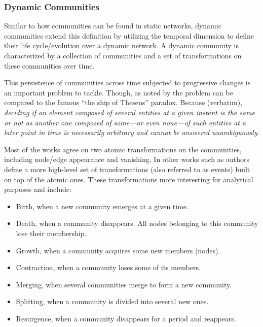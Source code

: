\documentclass[
acmsmall,
nonacm,
screen,
acmthm]{acmart}
\providecommand{\tightlist}{%
\setlength{\itemsep}{0pt}\setlength{\parskip}{0pt}}
\begin{document}
\hypertarget{dynamic-communities}{%
\subsubsection{Dynamic Communities}\label{dynamic-communities}}

Similar to how communities can be found in static networks, dynamic
communities extend this definition by utilizing the temporal dimension
to define their life cycle/evolution over a dynamic network. A dynamic
community is characterized by a collection of communities and a set of
transformations on these communities over time.

This persistence of communities across time subjected to progressive
changes is an important problem to tackle. Though, as noted by
\citep{rossettiCommunityDiscoveryDynamic2018} the problem can be
compared to the famous ``the ship of Theseus'' paradox. Because
(verbatim), \emph{deciding if an element composed of several entities at
a given instant is the same or not as another one composed of some---or
even none---of such entities at a later point in time is necessarily
arbitrary and cannot be answered unambiguously}.

Most of the works agree on two atomic transformations on the
communities, including node/edge appearance and vanishing. In other
works such as
\citep{pallaQuantifyingSocialGroup2007, asurEventbasedFrameworkCharacterizing2009, cazabetUsingDynamicCommunity2012}
authors define a more high-level set of transformations (also referred
to as events) built on top of the atomic ones. These transformations
more interesting for analytical purposes and include:

\begin{itemize}
\tightlist
\item
  Birth, when a new community emerges at a given time.~
\item
  Death, when a community disappears. All nodes belonging to this
  community lose their membership.
\item
  Growth, when a community acquires some new members (nodes).
\item
  Contraction, when a community loses some of its members.
\item
  Merging, when several communities merge to form a new community.
\item
  Splitting, when a community is divided into several new ones.
\item
  Resurgence, when a community disappears for a period and reappears.
\end{itemize}
\end{document}
